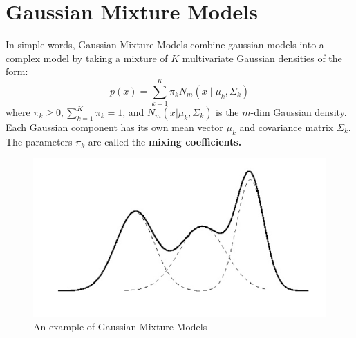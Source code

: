 \section{Gaussian Mixture Models}
In simple words, Gaussian Mixture Models combine gaussian models into a complex model by taking a mixture of $K$ multivariate Gaussian densities of the form:
$$
p(x)=\sum_{k=1}^K \pi_k N_m\left(x \mid \mu_k, \Sigma_k\right)
$$
where $\pi_k \geq 0, \sum_{k=1}^K \pi_k=1$, and $N_m\left(x |\mu_k, \Sigma_k\right)$ is the $m$-dim Gaussian density.\\
Each Gaussian component has its own mean vector $\mu_k$ and covariance matrix $\Sigma_k$.\\
The parameters $\pi_k$ are called the \textbf{mixing coefficients.}

\begin{figure}[H]
    \centering
    \includegraphics[width = .4\linewidth]{figures/section9/figure_9_1.png}
    \caption{An example of Gaussian Mixture Models}
    \label{fig:Gaussian-Mixture}
\end{figure}